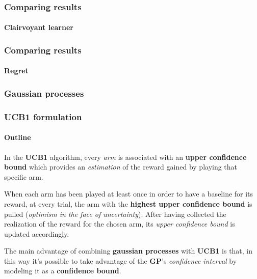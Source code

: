 
\begin{frame}

\frametitle{Comparing results}
\framesubtitle{Clairvoyant learner}


\end{frame}


\begin{frame}

\frametitle{Comparing results}
\framesubtitle{Regret}


\end{frame}


\begin{frame}

\frametitle{Gaussian processes}


\end{frame}


\begin{frame}

\frametitle{UCB1 formulation}
\framesubtitle{Outline}

In the \textbf{UCB1} algorithm, every \textit{arm} is associated with an \textbf{upper confidence bound} which provides an \textit{estimation} of the reward gained by playing that specific arm.

When each arm has been played at least once in order to have a baseline for its reward, at every trial, the arm with the \textbf{highest upper confidence bound} is pulled (\textit{optimism in the face of uncertainty}).
After having collected the realization of the reward for the chosen arm, its \textit{upper confidence bound} is updated accordingly.

The main advantage of combining \textbf{gaussian processes} with \textbf{UCB1} is that, in this way it's possible to take advantage of the \textbf{GP}'s \textit{confidence interval} by modeling it as a \textbf{confidence bound}.

\end{frame}

